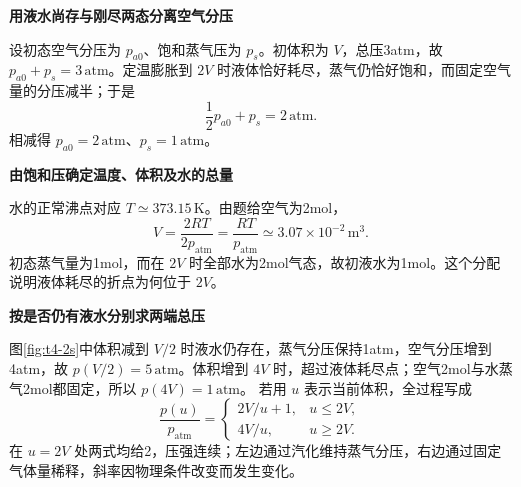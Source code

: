 \begin{solution}\textbf{用液水尚存与刚尽两态分离空气分压}\par\nobreak
设初态空气分压为 $p_{a0}$、饱和蒸气压为 $p_s$。初体积为 $V$，总压3atm，故 $p_{a0}+p_s=3\,\mathrm{atm}$。定温膨胀到 $2V$ 时液体恰好耗尽，蒸气仍恰好饱和，而固定空气量的分压减半；于是
\[\frac12p_{a0}+p_s=2\,\mathrm{atm}.\]
相减得 $p_{a0}=2\,\mathrm{atm}$、$p_s=1\,\mathrm{atm}$。

\par\medskip{}\noindent\textbf{由饱和压确定温度、体积及水的总量}\par\nobreak
水的正常沸点对应 $T\simeq373.15\,\mathrm K$。由题给空气为2mol，
\[V=\frac{2RT}{2p_{\mathrm{atm}}}=\frac{RT}{p_{\mathrm{atm}}}\simeq3.07\times10^{-2}\,\mathrm{m^3}.\]
初态蒸气量为1mol，而在 $2V$ 时全部水为2mol气态，故初液水为1mol。这个分配说明液体耗尽的折点为何位于 $2V$。



\par\medskip{}\noindent\textbf{按是否仍有液水分别求两端总压}\par\nobreak
图\ref{fig:t4-2s}中体积减到 $V/2$ 时液水仍存在，蒸气分压保持1atm，空气分压增到4atm，故 $\boxed{p(V/2)=5\,\mathrm{atm}}$。体积增到 $4V$ 时，超过液体耗尽点；空气2mol与水蒸气2mol都固定，所以 $\boxed{p(4V)=1\,\mathrm{atm}}$。
若用 $u$ 表示当前体积，全过程写成
\[\boxed{\frac{p(u)}{p_{\mathrm{atm}}}=\begin{cases}2V/u+1,&u\le2V,\\4V/u,&u\ge2V.\end{cases}}\]
在 $u=2V$ 处两式均给2，压强连续；左边通过汽化维持蒸气分压，右边通过固定气体量稀释，斜率因物理条件改变而发生变化。
\end{solution}
